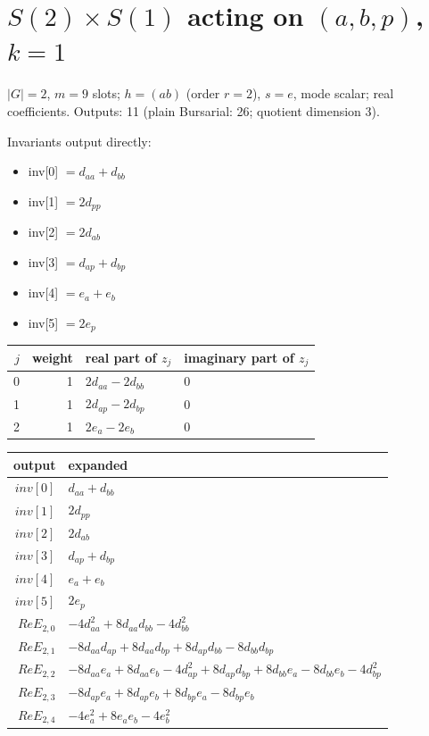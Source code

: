 \documentclass[10pt]{article}
\begin{document}
\clearpage
\section{$S(2) \times S(1)$ acting on $(a, b, p)$, $k = 1$}
$|G| = 2$, $m = 9$ slots; $h = (a b)$ (order $r = 2$), $s = e$, mode scalar; real coefficients. Outputs: 11 (plain Bursarial: 26; quotient dimension 3).

Invariants output directly:
\begin{itemize}
  \item inv[0] $= d_{aa} + d_{bb}$
  \item inv[1] $= 2 d_{pp}$
  \item inv[2] $= 2 d_{ab}$
  \item inv[3] $= d_{ap} + d_{bp}$
  \item inv[4] $= e_{a} + e_{b}$
  \item inv[5] $= 2 e_{p}$
\end{itemize}

\begin{longtable}{rr>{\raggedright\arraybackslash}p{}>{\raggedright\arraybackslash}p{}}
$j$ & weight & real part of $z_j$ & imaginary part of $z_j$ \\ \hline
0 & 1 & $2 d_{aa} - 2 d_{bb}$ & $0$ \\
1 & 1 & $2 d_{ap} - 2 d_{bp}$ & $0$ \\
2 & 1 & $2 e_{a} - 2 e_{b}$ & $0$ \\
\end{longtable}

\begin{longtable}{r>{\raggedright\arraybackslash}p{}}
output & expanded \\ \hline
$inv[0]$ & $d_{aa} + d_{bb}$ \\
$inv[1]$ & $2 d_{pp}$ \\
$inv[2]$ & $2 d_{ab}$ \\
$inv[3]$ & $d_{ap} + d_{bp}$ \\
$inv[4]$ & $e_{a} + e_{b}$ \\
$inv[5]$ & $2 e_{p}$ \\
$Re E_{2,0}$ & $- 4 d_{aa}^{2} + 8 d_{aa} d_{bb} - 4 d_{bb}^{2}$ \\
$Re E_{2,1}$ & $- 8 d_{aa} d_{ap} + 8 d_{aa} d_{bp} + 8 d_{ap} d_{bb} - 8 d_{bb} d_{bp}$ \\
$Re E_{2,2}$ & $- 8 d_{aa} e_{a} + 8 d_{aa} e_{b} - 4 d_{ap}^{2} + 8 d_{ap} d_{bp} + 8 d_{bb} e_{a} - 8 d_{bb} e_{b} - 4 d_{bp}^{2}$ \\
$Re E_{2,3}$ & $- 8 d_{ap} e_{a} + 8 d_{ap} e_{b} + 8 d_{bp} e_{a} - 8 d_{bp} e_{b}$ \\
$Re E_{2,4}$ & $- 4 e_{a}^{2} + 8 e_{a} e_{b} - 4 e_{b}^{2}$ \\
\end{longtable}
\end{document}
